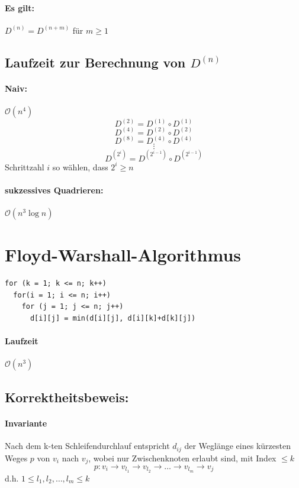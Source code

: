 \paragraph{Es gilt:} $D^{(n)} = D^{(n+m)}$ für $m\geq 1$
\subsection{Laufzeit zur Berechnung von $D^{(n)}$ }
\paragraph{Naiv:} $\mathcal{O}(n^4)$
\[ D^{(2)} = D^{(1)} \circ D^{(1)} \]
\[ D^{(4)} = D^{(2)} \circ D^{(2)} \]
\[ D^{(8)} = D^{(4)} \circ D^{(4)} \]
\[ \vdots\]
\[ D^{(2^i)} = D^{(2^{i-1})} \circ D^{(2^{i-1})} \]
Schrittzahl $i$ so wählen, dass $2^i \geq n$
\paragraph{sukzessives Quadrieren:} $\mathcal{O}(n^3\log n)$
\section{Floyd-Warshall-Algorithmus}
\begin{lstlisting}[style = pseudo]
for (k = 1; k <= n; k++)
  for(i = 1; i <= n; i++)
    for (j = 1; j <= n; j++)
      d[i][j] = min(d[i][j], d[i][k]+d[k][j])
\end{lstlisting}
\paragraph{Laufzeit} $\mathcal{O}(n^3)$
\subsection{Korrektheitsbeweis:}
\paragraph{Invariante} Nach dem k-ten Schleifendurchlauf entspricht $d_{ij}$ der Weglänge eines kürzesten Weges $p$ von $v_i$ nach $v_j$, 
wobei nur Zwischenknoten erlaubt sind, mit Index $\leq k$  \[p:v_i \rightarrow v_{l_1} \rightarrow v_{l_2} \rightarrow \ldots \rightarrow v_{l_m} \rightarrow v_j\]
d.h. $1\leq l_1,l_2,\ldots,l_m\leq k$
\pagebreak
